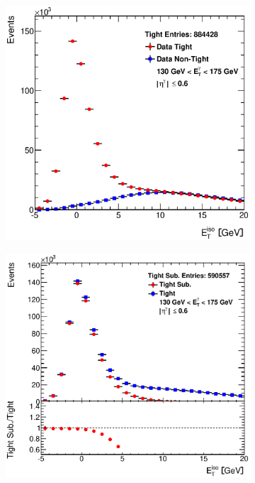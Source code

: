 \documentclass[12pt, twoside]{article}
\numberwithin{equation}{section}
\numberwithin{figure}{section}
\begin{document}
\begin{figure}[h]
    \centering
    \begin{subfigure}[b]{0.4\textwidth}
        \includegraphics[width=\textwidth]{./images/EtISOCorrection/T_vs_NT-11(20GeV).eps}
        \subcaption{}
        \label{fig:TightVSNonTight}
    \end{subfigure}
    \hspace{1.0cm}
    \begin{subfigure}[b]{0.4\textwidth}
        \includegraphics[width=\textwidth]{./images/EtISOCorrection/T_SUB-11(20GeV).eps}
        \subcaption{}
        \label{fig:TightSubtracted}
    \end{subfigure}


\end{figure}
\end{document}
